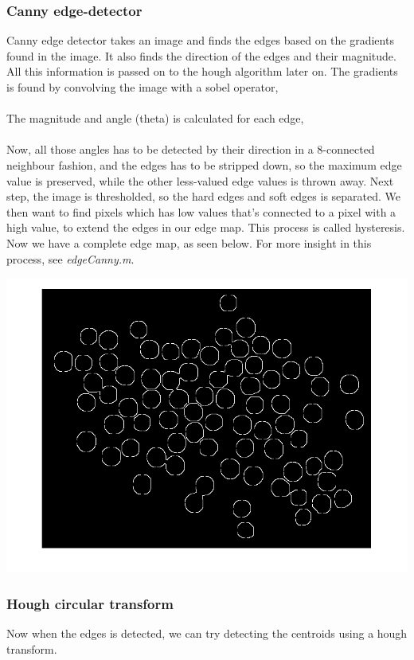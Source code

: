 \subsubsection{Canny edge-detector}
Canny edge detector takes an image and finds the edges based on the gradients found in the image. It also finds the direction of the edges and their magnitude. All this information is passed on to the hough algorithm later on. The gradients is found by convolving the image with a sobel operator,
\\

\mbox{}\\
The magnitude and angle (theta) is calculated for each edge,
\\

\mbox{}\\
Now, all those angles has to be detected by their direction in a 8-connected neighbour fashion, and the edges has to be stripped down, so the maximum edge value is preserved, while the other less-valued edge values is thrown away. Next step, the image is thresholded, so the hard edges and soft edges is separated. We then want to find pixels which has low values that's connected to a pixel with a high value, to extend the edges in our edge map. This process is called hysteresis. Now we have a complete edge map, as seen below. For more insight in this process, see \emph{edgeCanny.m}.
\\
\centerline{\includegraphics[scale=0.3]{../results/sweetsA03_edges.png}}
\subsubsection{Hough circular transform}
Now when the edges is detected, we can try detecting the centroids using a hough transform. 
